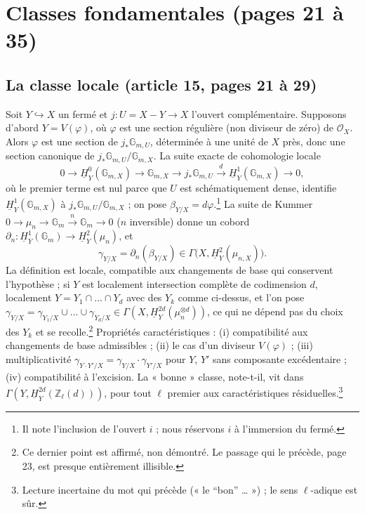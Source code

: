 \documentclass[11pt,a4paper]{article}
\begin{document}
\section*{Classes fondamentales (pages 21 à 35)}

\subsection*{La classe locale (article 15, pages 21 à 29)}

Soit $Y \hookrightarrow X$ un fermé et $j : U = X - Y \to X$ l'ouvert
complémentaire. Supposons d'abord $Y = V(\varphi)$, où $\varphi$ est une section
régulière (non diviseur de zéro) de $\mathcal{O}_{X}$. Alors $\varphi$ est une
section de $j_{*}\mathbb{G}_{m,U}$, déterminée à une unité de $X$ près,
donc une section canonique de $j_{*}\mathbb{G}_{m,U}/\mathbb{G}_{m,X}$. La suite
exacte de cohomologie locale
\[
  0 \to \underline{H}^{0}_{Y}(\mathbb{G}_{m,X}) \to \mathbb{G}_{m,X} \to
  j_{*}\mathbb{G}_{m,U} \xrightarrow{\ d\ } \underline{H}^{1}_{Y}(\mathbb{G}_{m,X})
  \to 0,
\]
où le premier terme est nul parce que $U$ est schématiquement dense, identifie
$\underline{H}^{1}_{Y}(\mathbb{G}_{m,X})$ à $j_{*}\mathbb{G}_{m,U} /
\mathbb{G}_{m,X}$ ; on pose $\beta_{Y/X} = d\varphi$.\footnote{Il note
l'inclusion de l'ouvert $i$ ; nous réservons $i$ à l'immersion du fermé.} La
suite de Kummer $0 \to \mu_{n} \to \mathbb{G}_{m} \xrightarrow{n} \mathbb{G}_{m}
\to 0$ ($n$ inversible) donne un cobord $\partial_{n} :
\underline{H}^{1}_{Y}(\mathbb{G}_{m}) \to \underline{H}^{2}_{Y}(\mu_{n})$, et
\[
  \gamma_{Y/X} = \partial_{n}(\beta_{Y/X}) \in
  \Gamma\bigl(X, \underline{H}^{2}_{Y}(\mu_{n,X})\bigr).
\]
La définition est locale, compatible aux changements de base qui conservent
l'hypothèse ; si $Y$ est localement intersection complète de codimension $d$,
localement $Y = Y_{1} \cap \dots \cap Y_{d}$ avec des $Y_{k}$ comme ci-dessus,
et l'on pose $\gamma_{Y/X} = \gamma_{Y_{1}/X} \cup \dots \cup \gamma_{Y_{d}/X}
\in \Gamma(X, \underline{H}^{2d}_{Y}(\mu_{n}^{\otimes d}))$, ce qui ne dépend
pas du choix des $Y_{k}$ et se recolle.\footnote{Ce dernier point est affirmé,
non démontré. Le passage qui le précède, page 23, est presque entièrement
illisible.} Propriétés caractéristiques : (i) compatibilité aux changements de
base admissibles ; (ii) le cas d'un diviseur $V(\varphi)$ ; (iii)
multiplicativité $\gamma_{Y \cdot Y'/X} = \gamma_{Y/X}\cdot\gamma_{Y'/X}$ pour
$Y$, $Y'$ sans composante excédentaire ; (iv) compatibilité à l'excision. La
« bonne » classe, note-t-il, vit dans $\Gamma(Y,
\underline{H}^{2d}_{Y}(\mathbb{Z}_{\ell}(d)))$, pour tout $\ell$ premier aux
caractéristiques résiduelles.\footnote{Lecture incertaine du mot qui précède
(« le “bon” … ») ; le sens $\ell$-adique est sûr.}
\end{document}

